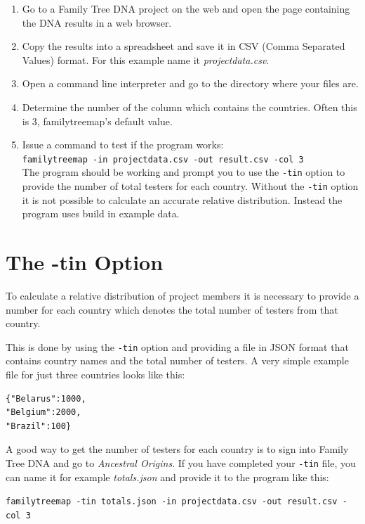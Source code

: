 \documentclass[12pt,a4paper]{article}
\begin{document}
\begin{enumerate}
\item Go to a Family Tree DNA project on the web and open the
  page containing the DNA results in a web browser.
\item Copy the results into a spreadsheet and save it in
  CSV (Comma Separated Values) format. For this example
  name it \emph{projectdata.csv}.
\item Open a command line interpreter and go to the
   directory where your files are.
\item Determine the number of the column which contains
  the countries. Often this is 3, familytreemap's default
  value.
\item Issue a command to test if the program works:\\
  \texttt{familytreemap -in projectdata.csv -out result.csv -col 3}\\
  The program should be working and prompt you to use
  the \texttt{-tin} option to provide the number of total testers
  for each country. Without the \texttt{-tin} option it
  is not possible to calculate an accurate relative distribution.
  Instead the program uses build in example data.
\end{enumerate}


\section{The -tin Option}

To calculate a relative distribution of project members it
is necessary to provide a number for each country which
denotes the total number of testers from that country.

This is done by using the \texttt{-tin} option and providing
a file in JSON format that contains country names and the
total number of testers. A very simple example file for just
three countries looks like this:

\begin{verbatim}
{"Belarus":1000,
"Belgium":2000,
"Brazil":100}
\end{verbatim}

\noindent
A good way to get the number of testers for each country 
is to sign into Family Tree DNA and go to \emph{Ancestral Origins}.
If you have completed your \texttt{-tin} file, you can
name it for example \emph{totals.json} and provide it to
the program like this:

\vspace{1ex}
\noindent
\texttt{familytreemap -tin totals.json -in projectdata.csv -out result.csv -col 3}
\vspace{1ex}
\end{document}
